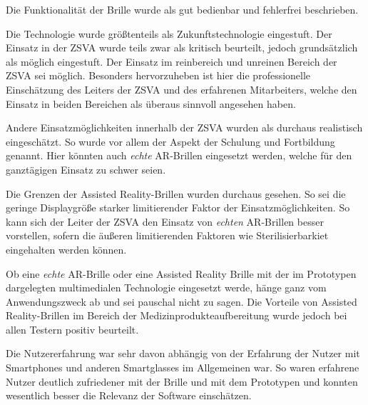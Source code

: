 Die Funktionalität der Brille wurde als gut bedienbar und fehlerfrei beschrieben.

Die Technologie wurde größtenteils als Zukunftstechnologie eingestuft. Der Einsatz in der ZSVA wurde teils zwar als kritisch beurteilt, jedoch grundsätzlich als möglich eingestuft. Der Einsatz im reinbereich und unreinen Bereich der ZSVA sei möglich. Besonders hervorzuheben ist hier die professionelle Einschätzung des Leiters der ZSVA und des erfahrenen Mitarbeiters, welche den Einsatz in beiden Bereichen als überaus sinnvoll angesehen haben.

Andere Einsatzmöglichkeiten innerhalb der ZSVA wurden als durchaus realistisch eingeschätzt. So wurde vor allem der Aspekt der Schulung und Fortbildung genannt. Hier könnten auch \emph{echte} AR-Brillen eingesetzt werden, welche für den ganztägigen Einsatz zu schwer seien.

Die Grenzen der Assisted Reality-Brillen wurden durchaus gesehen. So sei die geringe Displaygröße starker limitierender Faktor der Einsatzmöglichkeiten. So kann sich der Leiter der ZSVA den Einsatz von \emph{echten} AR-Brillen besser vorstellen, sofern die äußeren limitierenden Faktoren wie Sterilisierbarkiet eingehalten werden können.

Ob eine \emph{echte} AR-Brille oder eine Assisted Reality Brille mit der im Prototypen dargelegten multimedialen Technologie eingesetzt werde, hänge ganz vom Anwendungszweck ab und sei pauschal nicht zu sagen. Die Vorteile von Assisted Reality-Brillen im Bereich der Medizinprodukteaufbereitung wurde jedoch bei allen Testern positiv beurteilt.

Die Nutzererfahrung war sehr davon abhängig von der Erfahrung der Nutzer mit Smartphones und anderen Smartglasses im Allgemeinen war. So waren erfahrene Nutzer deutlich zufriedener mit der Brille und mit dem Prototypen und konnten wesentlich besser die Relevanz der Software einschätzen. 